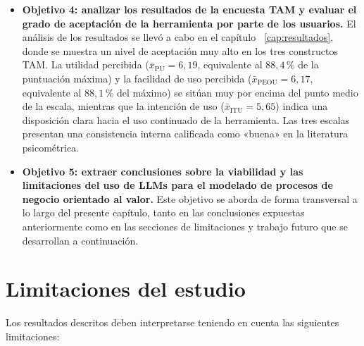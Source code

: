 \begin{itemize}
  \item \textbf{Objetivo 4: analizar los resultados de la encuesta TAM y evaluar el grado de aceptación de la herramienta por parte de los usuarios.}
  El análisis de los resultados se llevó a cabo en el capítulo ~\ref{cap:resultados}, donde se muestra un nivel de aceptación muy alto en los tres constructos TAM. La utilidad percibida ($\bar{x}_{\text{PU}} = 6{,}19$, equivalente al $88{,}4$\,\% de la puntuación máxima) y la facilidad de uso percibida ($\bar{x}_{\text{PEOU}} = 6{,}17$, equivalente al $88{,}1$\,\% del máximo) se sitúan muy por encima del punto medio de la escala, mientras que la intención de uso ($\bar{x}_{\text{ITU}} = 5{,}65$) indica una disposición clara hacia el uso continuado de la herramienta. Las tres escalas presentan una consistencia interna calificada como «buena» en la literatura psicométrica.

  \item \textbf{Objetivo 5: extraer conclusiones sobre la viabilidad y las limitaciones del uso de LLMs para el modelado de procesos de negocio orientado al valor.} 
  Este objetivo se aborda de forma transversal a lo largo del presente capítulo, tanto en las conclusiones expuestas anteriormente como en las secciones de limitaciones y trabajo futuro que se desarrollan a continuación.


\end{itemize}

\section{Limitaciones del estudio}\label{sec:limitaciones}

Los resultados descritos deben interpretarse teniendo en cuenta las siguientes limitaciones:

